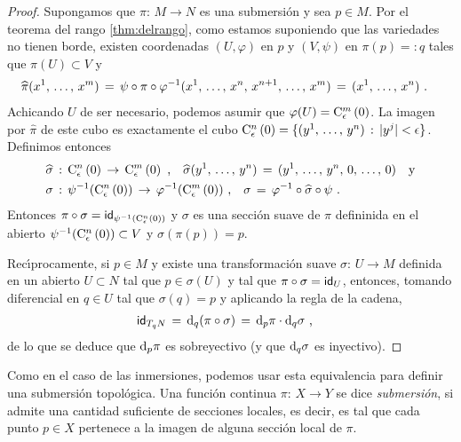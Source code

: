 \begin{proof}
	Supongamos que $\pi:\,M\rightarrow N$  es una submersi\'{o}n y sea
	$p\in M$. Por el teorema del rango \ref{thm:delrango}, como estamos
	suponiendo que las variedades no tienen borde, existen coordenadas
	$(U,\varphi)$ en $p$ y $(V,\psi)$ en $\pi(p)=:q$ tales que
	$\pi(U)\subset V$ y
	\begin{align*}
		\widehat{\pi}(\lista*{x}{m}) & \,=\,
			\psi\circ\pi\circ\varphi^{-1}(\lista*{x}{n},\,
				x^{n+1},\,\dots,\,x^{m})
			\,=\,(\lista*{x}{n})
		\text{ .}
	\end{align*}
	Achicando $U$ de ser necesario, podemos asumir que
	$\varphi(U)=\cubo[m]{\epsilon}{0}$. La imagen por $\widehat{\pi}$
	de este cubo es exactamente el cubo $\cubo[n]{\epsilon}{0}=%
	\{(\lista*{y}{n})\,:\,|y^{j}|<\epsilon\}$. Definimos entonces
	\begin{align*}
		\widehat{\sigma} & \,:\,\cubo[n]{\epsilon}{0}\,\rightarrow\,
			\cubo[m]{\epsilon}{0}\text{ ,}\quad
			\widehat{\sigma}(\lista*{y}{n})\,=\,
			(\lista*{y}{n},\,0,\,\dots,\,0)
			\quad\text{y}\\
		\sigma & \,:\,\psi^{-1}(\cubo[n]{\epsilon}{0}) \,\rightarrow\,
			\varphi^{-1}(\cubo[m]{\epsilon}{0})
				\text{ ,}\quad
			\sigma\,=\,\varphi^{-1}\circ\widehat{\sigma}\circ\psi
		\text{ .}
	\end{align*}
	Entonces $\pi\circ\sigma=\id[\psi^{-1}({\cubo[n]{\epsilon}{0}})]$ y
	$\sigma$ es una secci\'{o}n suave de $\pi$ defininida en el
	abierto $\psi^{-1}(\cubo[n]{\epsilon}{0})\subset V$ y
	$\sigma(\pi(p))=p$.

	Rec\'{\i}procamente, si $p\in M$ y existe una transformaci\'{o}n
	suave $\sigma:\,U\rightarrow M$ definida en un abierto $U\subset N$
	tal que $p\in\sigma(U)$ y tal que $\pi\circ\sigma=\id[U]$, entonces,
	tomando diferencial en $q\in U$ tal que $\sigma(q)=p$ y aplicando
	la regla de la cadena,
	\begin{align*}
		\id[T_{q}N] & \,=\,\diferencial[q]{(\pi\circ\sigma)} \,=\,
			\diferencial[p]{\pi}\cdot\diferencial[q]{\sigma}
		\text{ ,}
	\end{align*}
	de lo que se deduce que $\diferencial[p]{\pi}$ es sobreyectivo
	(y que $\diferencial[q]{\sigma}$ es inyectivo).
\end{proof}

Como en el caso de las inmersiones, podemos usar esta equivalencia para
definir una submersi\'{o}n topol\'{o}gica. Una funci\'{o}n continua
$\pi:\,X\rightarrow Y$ se dice \emph{submersi\'{o}n}, si admite una
cantidad suficiente de secciones locales, es decir, es tal que cada punto
$p\in X$ pertenece a la imagen de alguna secci\'{o}n local de $\pi$.

